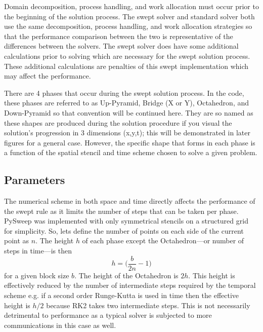 \documentclass[review]{elsarticle}
\begin{document}
\par Domain decomposition, process handling, and work allocation must occur prior to the beginning of the solution process. The swept solver and standard solver both use the same decomposition, process handling, and work allocation strategies so that the performance comparison between the two is representative of the differences between the solvers. The swept solver does have some additional calculations prior to solving which are necessary for the swept solution process. These additional calculations are penalties of this swept implementation which may affect the performance. 

\par
There are 4 phases that occur during the swept solution process. In the code, these phases are referred to as Up-Pyramid, Bridge (X or Y), Octahedron, and Down-Pyramid so that convention will be continued here. They are so named as these shapes are produced during the solution procedure if you visual the solution's progression in 3 dimensions (x,y,t); this will be demonstrated in later figures for a general case. However, the specific shape that forms in each phase is a function of the spatial stencil and time scheme chosen to solve a given problem.  

\subsection{Parameters}
\par
The numerical scheme in both space and time directly affects the performance of the swept rule as it limits the number of steps that can be taken per phase. PySweep was implemented with only symmetrical stencils on a structured grid for simplicity. So, lets define the number of points on each side of the current point as $n$. The height $h$ of each phase except the Octahedron---or number of steps in time---is then
\begin{equation}
    h = \bigg(\frac{b}{2n}-1\bigg)
\end{equation}
for a given block size $b$. The height of the Octahedron is $2h$. This height is effectively reduced by the number of intermediate steps required by the temporal scheme e.g. if a second order Runge-Kutta is used in time then the effective height is $h/2$ because RK2 takes two intermediate steps. This is not necessarily detrimental to performance as a typical solver is subjected to more communications in this case as well.
\end{document}
